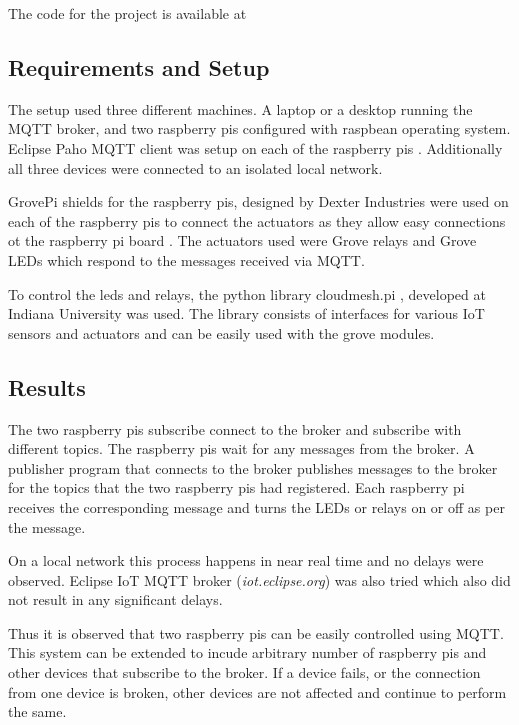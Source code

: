 The code for the project is available at 


\subsection{Requirements and Setup}

The setup used three different machines. A laptop or a desktop running
the MQTT broker, and two raspberry pis configured with raspbean
operating system. Eclipse Paho MQTT client was setup on each of the
raspberry pis \cite{python-paho-mqtt}. Additionally all three devices
were connected to an isolated local network.

GrovePi shields for the raspberry pis, designed by Dexter Industries
were used on each of the raspberry pis to connect the actuators as
they allow easy connections ot the raspberry pi board \cite{grovepi}.
The actuators used were Grove relays \cite{grove-relay} and Grove LEDs
\cite{grove-led} which respond to the messages received via MQTT.

To control the leds and relays, the python library cloudmesh.pi
\cite{cloudmesh.pi}, developed at Indiana University was used. The
library consists of interfaces for various IoT sensors and actuators
and can be easily used with the grove modules.



\subsection{Results}

The two raspberry pis subscribe connect to the broker and subscribe
with different topics. The raspberry pis wait for any messages from
the broker. A publisher program that connects to the broker publishes
messages to the broker for the topics that the two raspberry pis had
registered. Each raspberry pi receives the corresponding message and
turns the LEDs or relays on or off as per the message.

On a local network this process happens in near real time and no
delays were observed. Eclipse IoT MQTT broker ({\em iot.eclipse.org})
was also tried which also did not result in any significant delays.

Thus it is observed that two raspberry pis can be easily controlled
using MQTT. This system can be extended to incude arbitrary number of
raspberry pis and other devices that subscribe to the broker. If a
device fails, or the connection from one device is broken, other
devices are not affected and continue to perform the same.

